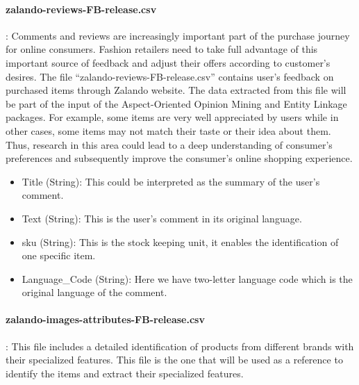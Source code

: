 \paragraph*{zalando-reviews-FB-release.csv}: Comments and reviews are increasingly important part of the purchase journey for online consumers. Fashion retailers need to take full advantage of this important source of feedback and adjust their offers according to customer’s desires. The file “zalando-reviews-FB-release.csv” contains user’s feedback on purchased items through Zalando website. The data extracted from this file will be part of the input of the Aspect-Oriented Opinion Mining and Entity Linkage packages. For example, some items are very well appreciated by users while in other cases, some items may not match their taste or their idea about them. Thus, research in this area could lead to a deep understanding of consumer’s preferences and subsequently improve the consumer’s online shopping experience.

\begin{itemize}
    \item Title (String): This could be interpreted as the summary of the user’s comment. 
    \item Text (String):  This is the user’s comment in its original language.
    \item sku (String): This is the stock keeping unit, it enables the identification of one specific item.
    \item Language\_Code (String): Here we have two-letter language code which is the original language of the comment.
\end{itemize}

\paragraph*{zalando-images-attributes-FB-release.csv}: This file includes a detailed identification of products from different brands with their specialized features. This file is the one that will be used as a reference to identify the items and extract their specialized features.


